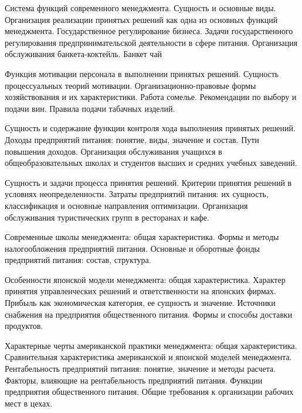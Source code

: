 \documentclass[
	11pt,
	a4paper,
	]
	{article}
\begin{document}
\bigskip

\noindent{} 
	{
		Система функций современного менеджмента. Сущность и основные виды. Организация реализации принятых решений как одна из основных функций менеджмента.
	}{
		Государственное регулирование бизнеса. Задачи государственного регулирования предпринимательской деятельности в сфере питания.
	}{
		Организация обслуживания банкета-коктейль. Банкет чай
	}

\bigskip

\noindent{} 
	{
		Функция мотивации персонала в выполнении принятых решений. Сущность процессуальных теорий мотивации.
	}{
		Организационно-правовые формы хозяйствования и их характеристики.
	}{
		Работа сомелье. Рекомендации по выбору и подачи вин. Правила подачи табачных изделий.
	}

\bigskip

\noindent{} 
	{
		Сущность и содержание функции контроля хода выполнения принятых решений.
	}{
		Доходы предприятий питания: понятие, виды, значение и состав. Пути повышения доходов.
	}{
		Организация обслуживания учащихся в общеобразовательных школах и студентов высших и средних учебных заведений.
	}

\bigskip

\noindent{} 
	{
		Сущность и задачи процесса принятия решений. Критерии принятия решений в условиях неопределенности.
	}{
		Затраты предприятий питания: их сущность, классификация и основные направления оптимизации.
	}{
		Организация обслуживания туристических групп в ресторанах и кафе.
	}

\bigskip

\noindent{} 
	{
		Современные школы менеджмента: общая характеристика.
	}{
		Формы и методы налогообложения предприятий питания.
	}{
		Основные и оборотные фонды предприятий питания: состав, структура.
	}

\bigskip

\noindent{} 
	{
		Особенности японской модели менеджмента: общая характеристика. Характер принятия управленческих решений и ответственности на японских фирмах.
	}{
		Прибыль как экономическая категория, ее сущность и значение.
	}{
		Источники снабжения на предприятия общественного питания. Формы и способы доставки продуктов.
	}

\bigskip

\noindent{} 
	{
		Характерные черты американской практики менеджмента: общая характеристика. Сравнительная характеристика американской и японской моделей менеджмента.
	}{
		Рентабельность предприятий питания: понятие, значение и методы расчета. Факторы, влияющие на рентабельность предприятий питания.
	}{
		Функции предприятия общественного питания. Общие требования к организации рабочих мест в цехах.
	}
\end{document}
